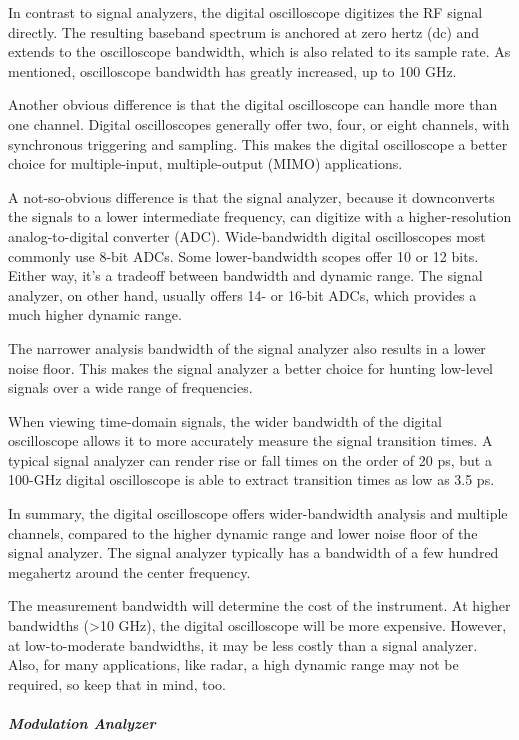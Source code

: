 In contrast to signal analyzers, the digital oscilloscope digitizes the RF signal directly. The resulting baseband spectrum is anchored at zero hertz (dc) and extends to the oscilloscope bandwidth, which is also related to its sample rate. As mentioned, oscilloscope bandwidth has greatly increased, up to 100 GHz.

Another obvious difference is that the digital oscilloscope can handle more than one channel. Digital oscilloscopes generally offer two, four, or eight channels, with synchronous triggering and sampling.  This makes the digital oscilloscope a better choice for multiple-input, multiple-output (MIMO) applications.

A not-so-obvious difference is that the signal analyzer, because it downconverts the signals to a lower intermediate frequency, can digitize with a higher-resolution analog-to-digital converter (ADC). Wide-bandwidth digital oscilloscopes most commonly use 8-bit ADCs. Some lower-bandwidth scopes offer 10 or 12 bits. Either way, it’s a tradeoff between bandwidth and dynamic range. The signal analyzer, on other hand, usually offers 14- or 16-bit ADCs, which provides a much higher dynamic range.

The narrower analysis bandwidth of the signal analyzer also results in a lower noise floor. This makes the signal analyzer a better choice for hunting low-level signals over a wide range of frequencies.

When viewing time-domain signals, the wider bandwidth of the digital oscilloscope allows it to more accurately measure the signal transition times. A typical signal analyzer can render rise or fall times on the order of 20 ps, but a 100-GHz digital oscilloscope is able to extract transition times as low as 3.5 ps.

In summary, the digital oscilloscope offers wider-bandwidth analysis and multiple channels, compared to the higher dynamic range and lower noise floor of the signal analyzer. The signal analyzer typically has a bandwidth of a few hundred megahertz around the center frequency.

The measurement bandwidth will determine the cost of the instrument. At higher bandwidths (>10 GHz), the digital oscilloscope will be more expensive. However, at low-to-moderate bandwidths, it may be less costly than a signal analyzer. Also, for many applications, like radar, a high dynamic range may not be required, so keep that in mind, too.

\subparagraph{Modulation Analyzer}

